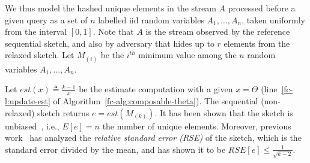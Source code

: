 We thus model the hashed unique elements in the stream $A$ processed before a given
query as a set of $n$ labelled iid random variables $A_1,\dots,A_n$, taken uniformly 
from the interval $[0,1]$. Note that
$A$ is the stream observed by the reference sequential sketch, and 
also by adversary that hides up to $r$ elements from the relaxed sketch. 
Let $M_{(i)}$ be the $i^{th}$ minimum value among the $n$ random variables $A_1,\dots,A_n$.

Let $est(x) \triangleq \frac{k-1}{x}$ be the estimate computation
with a given $x=\Theta$ (line~\ref{fc-l:update-est} of Algorithm~\ref{fc-alg:composable-theta}).
The sequential (non-relaxed) sketch returns $e=est(M_{(k)})$.
It has been shown that the sketch is unbiased~\cite{KMV}, i.e., $E[e]=n$ the number of unique elements.
Moreover, previous work~\cite{lee-theta} has analyzed the \emph{relative standard error (RSE)} of the sketch, which is 
the standard error divided by the mean, and has shown it to be  
$\textit{RSE}[e]\leq \frac{1}{\sqrt{k-2}}$.

